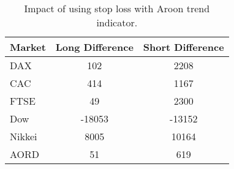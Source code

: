 \begin{table}[ht]
\centering
\caption[Impact of using stop loss with Aroon trend indicator]{Impact of using stop loss with Aroon trend indicator.} 
\label{tab:aroon_results_sloss_diff}
\begin{tabular}{lcc}
  \toprule Market & Long Difference & Short Difference \\ 
  \midrule DAX & 102 & 2208 \\ 
  CAC & 414 & 1167 \\ 
  FTSE & 49 & 2300 \\ 
  Dow & -18053 & -13152 \\ 
  Nikkei & 8005 & 10164 \\ 
  AORD & 51 & 619 \\ 
   \bottomrule \end{tabular}
\end{table}
